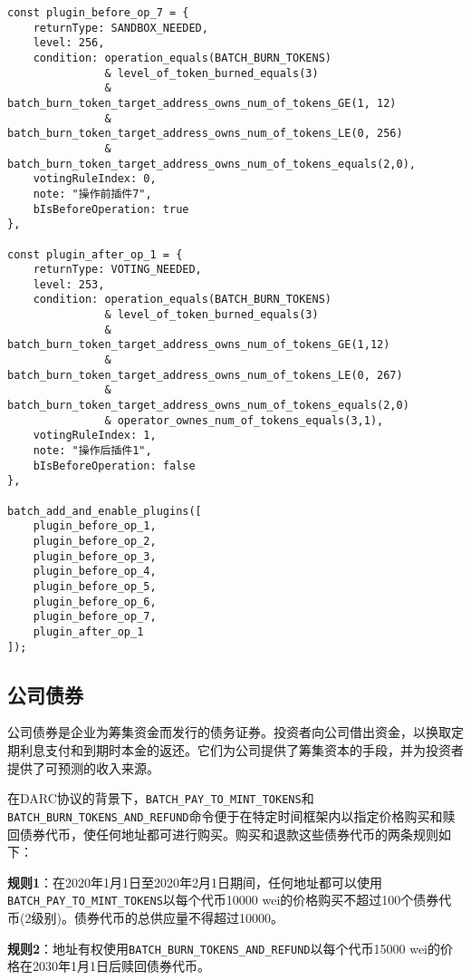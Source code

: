 \documentclass[main.tex]{subfiles}
\begin{document}
\begin{verbatim}
const plugin_before_op_7 = {
    returnType: SANDBOX_NEEDED,
    level: 256, 
    condition: operation_equals(BATCH_BURN_TOKENS)
               & level_of_token_burned_equals(3)
               & batch_burn_token_target_address_owns_num_of_tokens_GE(1, 12)
               & batch_burn_token_target_address_owns_num_of_tokens_LE(0, 256)
               & batch_burn_token_target_address_owns_num_of_tokens_equals(2,0),
    votingRuleIndex: 0, 
    note: "操作前插件7",
    bIsBeforeOperation: true  
},

const plugin_after_op_1 = {
    returnType: VOTING_NEEDED,
    level: 253, 
    condition: operation_equals(BATCH_BURN_TOKENS)
               & level_of_token_burned_equals(3)
               & batch_burn_token_target_address_owns_num_of_tokens_GE(1,12)
               & batch_burn_token_target_address_owns_num_of_tokens_LE(0, 267)
               & batch_burn_token_target_address_owns_num_of_tokens_equals(2,0) 
               & operator_ownes_num_of_tokens_equals(3,1),
    votingRuleIndex: 1, 
    note: "操作后插件1",
    bIsBeforeOperation: false  
},

batch_add_and_enable_plugins([
    plugin_before_op_1,
    plugin_before_op_2,
    plugin_before_op_3,
    plugin_before_op_4,
    plugin_before_op_5,
    plugin_before_op_6,
    plugin_before_op_7,
    plugin_after_op_1
]);
\end{verbatim}

\subsection{公司债券}

公司债券是企业为筹集资金而发行的债务证券。投资者向公司借出资金，以换取定期利息支付和到期时本金的返还。它们为公司提供了筹集资本的手段，并为投资者提供了可预测的收入来源。

在DARC协议的背景下，\texttt{BATCH\_PAY\_TO\_MINT\_TOKENS}和\texttt{BATCH\_BURN\_TOKENS\_AND\_REFUND}命令便于在特定时间框架内以指定价格购买和赎回债券代币，使任何地址都可进行购买。购买和退款这些债券代币的两条规则如下：

\textbf{规则1}：在2020年1月1日至2020年2月1日期间，任何地址都可以使用\texttt{BATCH\_PAY\_TO\_MINT\_TOKENS}以每个代币10000 wei的价格购买不超过100个债券代币(2级别)。债券代币的总供应量不得超过10000。

\textbf{规则2}：地址有权使用\texttt{BATCH\_BURN\_TOKENS\_AND\_REFUND}以每个代币15000 wei的价格在2030年1月1日后赎回债券代币。
\end{document}

